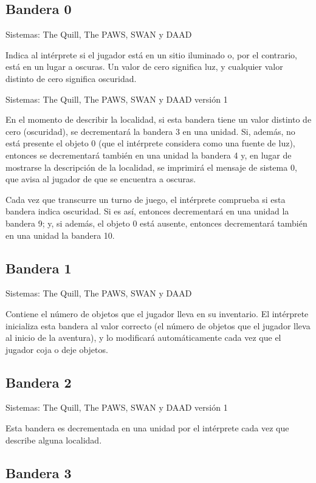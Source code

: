 \documentclass[11pt, a5paper]{article}
\newcommand{\quill}{\textsf{The Quill}\xspace}
\newcommand{\paw}{\textsf{The PAWS}\xspace}
\newcommand{\swan}{\textsf{SWAN}\xspace}
\newcommand{\daad}{\textsf{DAAD}\xspace}
\newcommand{\sistemas}[1]{\noindent Sistemas: #1 \nopagebreak}
\begin{document}
\subsection{Bandera 0}

\sistemas{\quill, \paw, \swan y \daad}

Indica al intérprete si el jugador está en un sitio iluminado o, por el contrario, está en un lugar a oscuras. Un valor de cero significa luz, y cualquier valor distinto de cero significa oscuridad.

\sistemas{\quill, \paw, \swan y \daad versión 1}

En el momento de describir la localidad, si esta bandera tiene un valor distinto de cero (oscuridad), se decrementará la bandera 3 en una unidad. Si, además, no está presente el objeto 0 (que el intérprete considera como una fuente de luz), entonces se decrementará también en una unidad la bandera 4 y, en lugar de mostrarse la descripción de la localidad, se imprimirá el mensaje de sistema 0, que avisa al jugador de que se encuentra a oscuras.

Cada vez que transcurre un turno de juego, el intérprete comprueba si esta bandera indica oscuridad. Si es así, entonces decrementará en una unidad la bandera 9; y, si además, el objeto 0 está ausente, entonces decrementará también en una unidad la bandera 10.

\subsection{Bandera 1}\label{flag1}

\sistemas{\quill, \paw, \swan y \daad}

Contiene el número de objetos que el jugador lleva en su inventario. El intérprete inicializa esta bandera al valor correcto (el número de objetos que el jugador lleva al inicio de la aventura), y lo modificará automáticamente cada vez que el jugador coja o deje objetos.

\subsection{Bandera 2}

\sistemas{\quill, \paw, \swan y \daad versión 1}

Esta bandera es decrementada en una unidad por el intérprete cada vez que describe alguna localidad.

\subsection{Bandera 3}
\end{document}
